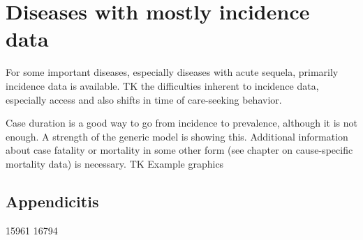 \section{Diseases with mostly incidence data}

For some important diseases, especially diseases with acute sequela,
primarily incidence data is available. TK the difficulties inherent to
incidence data, especially access and also shifts in time of
care-seeking behavior.

Case duration is a good way to go from incidence to prevalence,
although it is not enough. A strength of the generic model is showing
this. Additional information about case fatality or mortality in some
other form (see chapter on cause-specific mortality data) is
necessary.  TK Example graphics

\subsection{Appendicitis}
15961
16794

